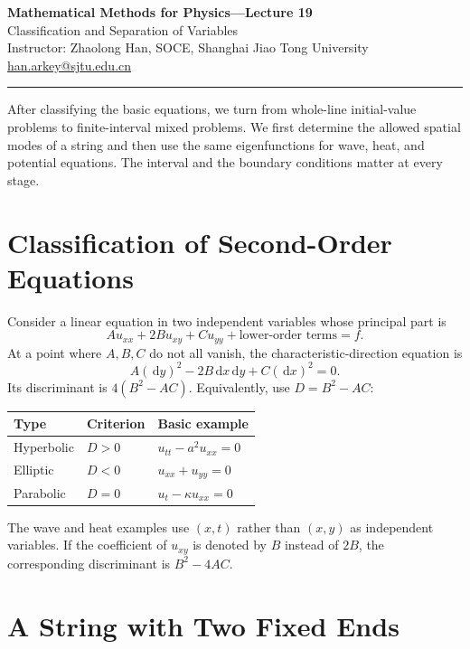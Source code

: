 \documentclass[11pt,a4paper]{article}
\newcommand{\dd}{\,\mathrm{d}}
\begin{document}
\begin{center}
  {\Large\bfseries Mathematical Methods for Physics---Lecture 19}\\[6pt]
  {\large Classification and Separation of Variables}\\[10pt]
  Instructor: Zhaolong Han, SOCE, Shanghai Jiao Tong University\\
  \href{mailto:han.arkey@sjtu.edu.cn}{han.arkey@sjtu.edu.cn}
\end{center}
\hrule\medskip
After classifying the basic equations, we turn from whole-line initial-value
problems to finite-interval mixed problems. We first determine the allowed
spatial modes of a string and then use the same eigenfunctions for wave, heat,
and potential equations. The interval and the boundary conditions matter at
every stage.

\section{Classification of Second-Order Equations}
Consider a linear equation in two independent variables whose principal part is
\begin{equation}
 Au_{xx}+2Bu_{xy}+Cu_{yy}+\text{lower-order terms}=f.
\end{equation}
At a point where $A,B,C$ do not all vanish, the characteristic-direction equation is
\begin{equation}
 A(\dd y)^2-2B\dd x\dd y+C(\dd x)^2=0.
\end{equation}
Its discriminant is $4(B^2-AC)$. Equivalently, use $D=B^2-AC$:
\begin{center}
\begin{tabular}{@{}lll@{}}
\toprule
Type & Criterion & Basic example\\
\midrule
Hyperbolic & $D>0$ & $u_{tt}-a^2u_{xx}=0$\\
Elliptic & $D<0$ & $u_{xx}+u_{yy}=0$\\
Parabolic & $D=0$ & $u_t-\kappa u_{xx}=0$\\
\bottomrule
\end{tabular}
\end{center}
The wave and heat examples use $(x,t)$ rather than $(x,y)$ as independent
variables. If the coefficient of $u_{xy}$ is denoted by $B$ instead of $2B$,
the corresponding discriminant is $B^2-4AC$.

\section{A String with Two Fixed Ends}
\end{document}
